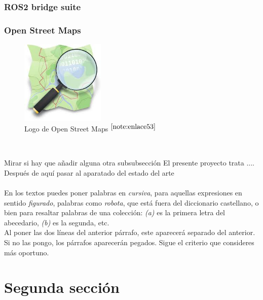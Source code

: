 \subsubsection{ROS2 bridge suite}

\subsubsection{Open Street Maps}


\begin{figure} [h!]
	\begin{center}
		\includegraphics[width=4cm]{figs/osm.png}
	\end{center}
	\caption{Logo de Open Street Maps $^{\ref{note:enlace53}}$} 
	\label{fig:osm}
\end{figure}\

\setcounter{footnote}{53} %


Mirar si hay que añadir alguna otra subsubsección
El presente proyecto trata ....\\


Después de aquí pasar al aparatado del estado del arte \\\\

En los textos puedes poner palabras en \textit{cursiva}, para aquellas expresiones en sentido \textit{figurado}, palabras como \textit{robota}, que está fuera del diccionario castellano, o bien para resaltar palabras de una colección: \textit{(a)} es la primera letra del abecedario, \textit{(b)} es la segunda, etc.\\

Al poner las dos líneas del anterior párrafo, este aparecerá separado del anterior. Si no las pongo, los párrafos aparecerán pegados. Sigue el criterio que consideres más oportuno.

\section{Segunda sección}
\label{sec:segundaseccion}

